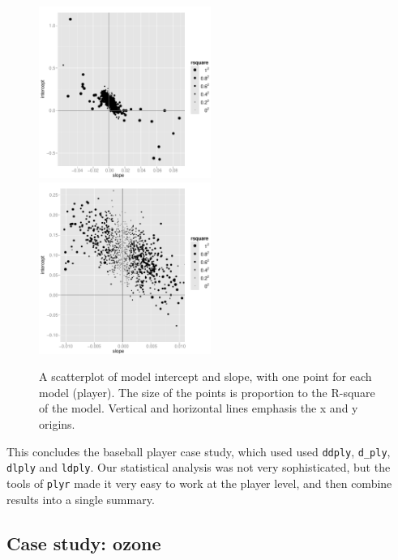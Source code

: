 \documentclass[letterpage]{scrartcl}
\begin{document}
\begin{figure}[htbp]
  \centering
    \includegraphics[width=0.5\textwidth]{models}%
    \includegraphics[width=0.5\textwidth]{models-zoom}
  \caption{A scatterplot of model intercept and slope, with one point for each model (player).  The size of the points is proportion to the R-square of the model. Vertical and horizontal lines emphasis the x and y origins. }
  \label{fig:models}
\end{figure}

This concludes the baseball player case study, which used used {\tt ddply}, {\tt d\_ply}, {\tt dlply} and {\tt ldply}.  Our statistical analysis was not very sophisticated, but the tools of {\tt plyr} made it very easy to work at the player level, and then combine results into a single summary.  

\subsection{Case study: ozone}
\label{sub:ozone}
\end{document}
